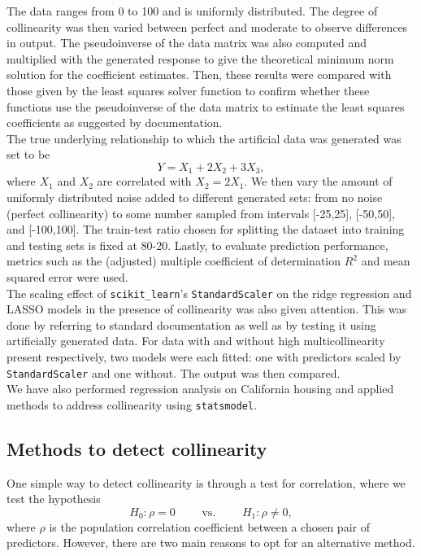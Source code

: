 \documentclass[12pt]{article}
\begin{document}
	The data ranges from 0 to 100 and is uniformly distributed. The degree of collinearity was then varied between perfect and moderate to observe differences in output. The pseudoinverse of the data matrix was also computed and multiplied with the generated response to give the theoretical minimum norm solution for the coefficient estimates. Then, these results were compared with those given by the least squares solver function to confirm whether these functions use the pseudoinverse of the data matrix to estimate the least squares coefficients as suggested by documentation.\\
	
	The true underlying relationship to which the artificial data was generated was set to be 
	$$Y=X_1+2X_2+3X_3,$$
	where $X_1$ and $X_2$ are correlated with $X_2=2X_1$. We then vary the amount of uniformly distributed noise added to different generated sets: from no noise (perfect collinearity) to some number sampled from intervals [-25,25], [-50,50], and [-100,100]. The train-test ratio chosen for splitting the dataset into training and testing sets is fixed at 80-20. Lastly, to evaluate prediction performance, metrics such as the (adjusted) multiple coefficient of determination $R^2$ and mean squared error were used.\\
	
	The scaling effect of \texttt{scikit\_learn}'s \texttt{StandardScaler} on the ridge regression and LASSO models in the presence of collinearity was also given attention. This was done by referring to standard documentation as well as by testing it using artificially generated data. For data with and without high multicollinearity present respectively, two models were each fitted: one with predictors scaled by \texttt{StandardScaler} and one without. The output was then compared. \\
	
	We have also performed regression analysis on California housing and applied methods to address collinearity using \texttt{statsmodel}. 
	
	\subsection{Methods to detect collinearity\label{sec:3.1}}
	
	One simple way to detect collinearity is through a test for correlation, where we test the hypothesis
	$$H_0: \rho=0 \quad\quad\text{ vs. }\quad\quad H_1: \rho\neq 0,$$
	where $\rho$ is the population correlation coefficient between a chosen pair of predictors. However, there are two main reasons to opt for an alternative method.
	
\end{document}
